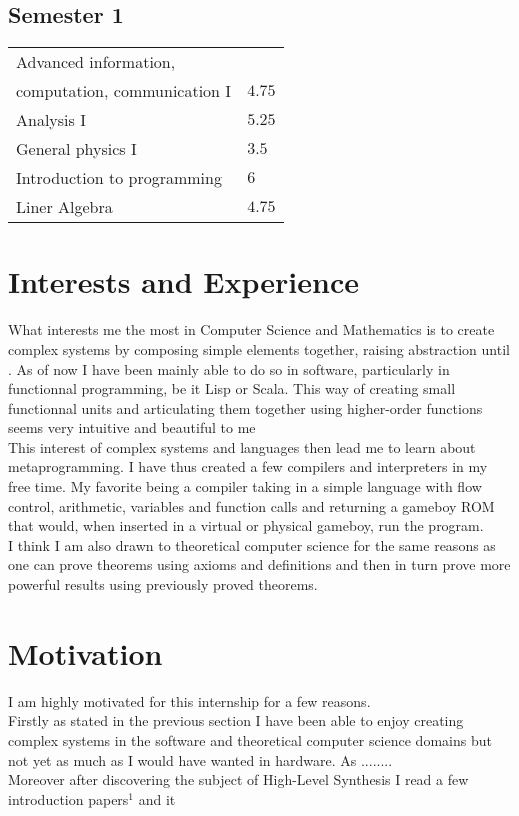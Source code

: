 \documentclass[11pt]{article}
\begin{document}
\begin{minipage}[t]{0.33\textwidth}
      \subsection*{Semester 1}
      \begin{tabular}{ >{\raggedright}m{4cm} m{2cm} }
        Advanced information, \\computation, communication I & $4.75$  \\ 
        Analysis I & $5.25$  \\  
        General physics I & $3.5$  \\  
        Introduction to programming & $6$  \\
        Liner Algebra & $4.75$ \\
      \end{tabular}
\end{minipage}%
\begin{minipage}[t]{0.66\textwidth}
    \section*{Interests and Experience}
    What interests me the most in Computer Science and Mathematics is to create complex systems by composing simple elements together, 
    raising abstraction until . As of now I have been mainly able to do so in software, particularly in functionnal programming, be it Lisp or Scala.
    This way of creating small functionnal units and articulating them together using higher-order functions seems very intuitive and beautiful to me \\
    This interest of complex systems and languages then lead me to learn about metaprogramming. I have thus created a few compilers and interpreters in my free time.
    My favorite being a compiler taking in a simple language with flow control, arithmetic, variables and function calls and returning a gameboy ROM that would,
     when inserted in a virtual or physical gameboy, run the program.\\
    I think I am also drawn to theoretical computer science for the same reasons as one can prove theorems using axioms and definitions and then in turn prove more
    powerful results using previously proved theorems.

    \section*{Motivation}
    I am highly motivated for this internship for a few reasons. \\
    Firstly as stated in the previous section I have been able to enjoy creating complex systems in the software and theoretical computer science domains 
    but not yet as much as I would have wanted in hardware. As ........\\
    Moreover after discovering the subject of High-Level Synthesis I read a few introduction papers$^1$ and it
\end{minipage}
\end{document}
